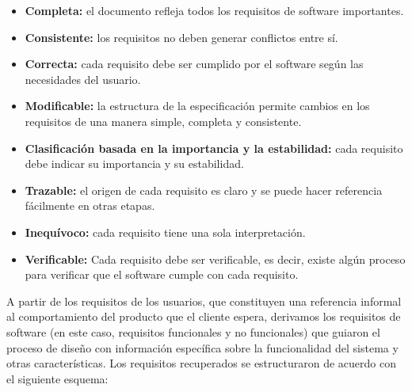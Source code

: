 \begin{itemize}

\item \textbf{Completa:} el documento refleja todos los requisitos de \gls{software} importantes.

\item \textbf{Consistente:} los requisitos no deben generar conflictos entre sí.

\item \textbf{Correcta:} cada requisito debe ser cumplido por el \gls{software} según las necesidades del usuario.


\item \textbf{Modificable:} la estructura de la especificación permite cambios en los requisitos de una manera simple, completa y consistente.

\item \textbf{Clasificación basada en la importancia y la estabilidad:} cada requisito debe indicar su importancia y su estabilidad.

\item \textbf{Trazable:} el origen de cada requisito es claro y se puede hacer referencia fácilmente en otras etapas.

\item \textbf{Inequívoco:} cada requisito tiene una sola interpretación.

\item \textbf{Verificable:} Cada requisito debe ser verificable, es decir, existe algún proceso para verificar que el \gls{software} cumple con cada requisito.

\end{itemize}

A partir de los requisitos de los usuarios, que constituyen una referencia informal al comportamiento del producto que el cliente espera, derivamos los requisitos de \gls{software} (en este caso, requisitos funcionales y no funcionales) que guiaron el proceso de diseño con información específica sobre la funcionalidad del sistema y otras características. Los requisitos recuperados se estructuraron de acuerdo con el siguiente esquema:


